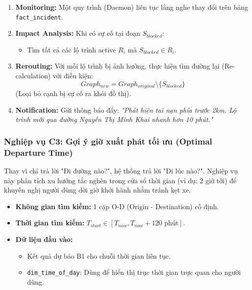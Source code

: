 \begin{enumerate}
    \item \textbf{Monitoring:} Một quy trình (Daemon) liên tục lắng nghe thay đổi trên bảng \texttt{fact\_incident}.
    \item \textbf{Impact Analysis:} Khi có sự cố tại đoạn $S_{blocked}$:
    \begin{itemize}
        \item Tìm tất cả các lộ trình active $R_i$ mà $S_{blocked} \in R_i$.
    \end{itemize}
    \item \textbf{Rerouting:} Với mỗi lộ trình bị ảnh hưởng, thực hiện tìm đường lại (Re-calculation) với điều kiện:
    \[ Graph_{new} = Graph_{original} \setminus \{S_{blocked}\} \]
    (Loại bỏ cạnh bị sự cố ra khỏi đồ thị).
    \item \textbf{Notification:} Gửi thông báo đẩy: \textit{"Phát hiện tai nạn phía trước 2km. Lộ trình mới qua đường Nguyễn Thị Minh Khai nhanh hơn 10 phút."}
\end{enumerate}

\subsubsection{Nghiệp vụ C3: Gợi ý giờ xuất phát tối ưu (Optimal Departure Time)}

Thay vì chỉ trả lời "Đi đường nào?", hệ thống trả lời "Đi lúc nào?". Nghiệp vụ này phân tích xu hướng tắc nghẽn trong cửa sổ thời gian (ví dụ: 2 giờ tới) để khuyến nghị người dùng dời giờ khởi hành nhằm tránh kẹt xe.

\begin{itemize}
    \item \textbf{Không gian tìm kiếm:} 1 cặp O-D (Origin - Destination) cố định.
    \item \textbf{Thời gian tìm kiếm:} $T_{start} \in [T_{now}, T_{now} + 120 \text{ phút}]$.
    \item \textbf{Dữ liệu đầu vào:}
    \begin{itemize}
        \item Kết quả dự báo B1 cho chuỗi thời gian liên tục.
        \item \texttt{dim\_time\_of\_day}: Dùng để hiển thị trục thời gian trực quan cho người dùng.
    \end{itemize}
\end{itemize}

